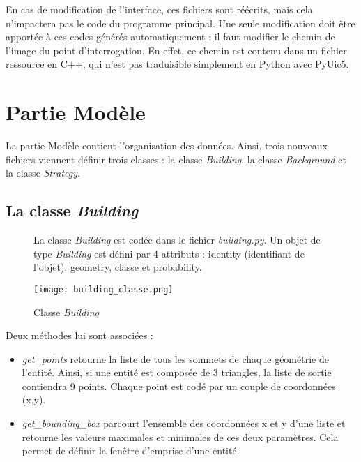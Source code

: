 En cas de modification de l'interface, ces fichiers sont réécrits, mais cela n'impactera pas le code du programme principal. Une seule modification doit être apportée à ces codes générés automatiquement : il faut modifier le chemin de l'image du point d'interrogation. En effet, ce chemin est contenu dans un fichier ressource en C++, qui n'est pas traduisible simplement en Python avec PyUic5. 

\newpage

\section{Partie Modèle}

La partie Modèle contient l'organisation des données. Ainsi, trois nouveaux fichiers viennent définir trois classes : la classe \textit{Building}, la classe \textit{Background} et la classe \textit{Strategy}.

\subsection{La classe \textit{Building}}

\begin{figure}[!h]
	\begin{minipage}{0.55\linewidth}\parindent12pt
		\indent La classe \textit{Building} est codée dans le fichier \textit{building.py}. Un objet de type \textit{Building} est défini par 4 attributs : identity (identifiant de l'objet), geometry, classe et probability. \\
	\end{minipage}
	\hfill
	\begin{minipage}{0.45\linewidth}
		\centering
		\texttt{[image: building\_classe.png]}  \\
		\caption[Classe \textit{Building}]{Classe \textit{Building}}
		\label{fig:classebuilgind}
	\end{minipage}
\end{figure}

\noindent Deux méthodes lui sont associées : 
\begin{itemize}[label=$\rightarrow$]
	\item \textit{get\_points} retourne la liste de tous les sommets de chaque géométrie de l'entité. Ainsi, si une entité est composée de 3 triangles, la liste de sortie contiendra 9 points. Chaque point est codé par un couple de coordonnées (x,y).
	\item \textit{get\_bounding\_box} parcourt l'ensemble des coordonnées x et y d'une liste et retourne les valeurs maximales et minimales de ces deux paramètres. Cela permet de définir la fenêtre d'emprise d'une entité.
\end{itemize}

